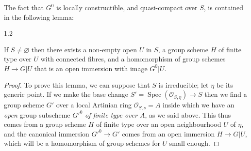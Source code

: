   The fact that \(G^0\) is locally constructible, and quasi-compact over \(S\), is contained in the following lemma:\begin{lemma}{1.2}\label{fga3.vi-1-lemma-1.2}\skipsinglepar\par{}If \(S\neq \varnothing \) then there exists a non-empty open \(U\) in \(S\), a group scheme \(H\) of finite type over \(U\) with connected fibres, and a homomorphism of group schemes \(H\to  G|U\) that is an open immersion with image \(G^0|U\).\begin{proof}\par{}To prove this lemma, we can suppose that \(S\) is irreducible;
      let \(\eta \) be its generic point.
      If we make the base change \(S'=\operatorname {Spec}(\mathcal {O}_{S,\eta })\to  S\) then we find a group scheme \(G'\) over a local Artinian ring \(\mathcal {O}_{S,s}=A\) inside which we have an \emph{open} group subscheme \({G'}^0\) \emph{of finite type over \(A\)}, as we said above.
      This thus comes from a group scheme \(H\) of finite type over an open neighbourhood \(U\) of \(\eta \), and the canonical immersion \({G'}^0\to  G'\) comes from an open immersion \(H\to  G|U\), which will be a homomorphism of group schemes for \(U\) small enough.
      

\end{proof}
\end{lemma}
